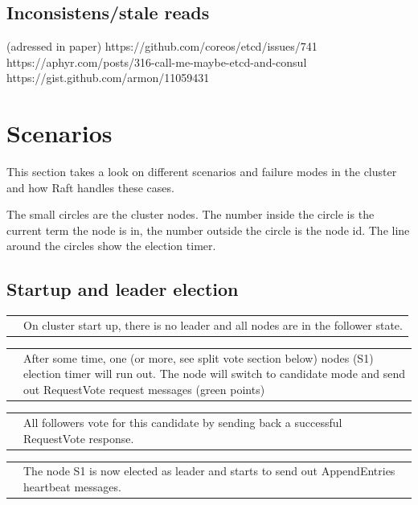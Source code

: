 \subsection{Inconsistens/stale reads}
(adressed in paper)
https://github.com/coreos/etcd/issues/741
https://aphyr.com/posts/316-call-me-maybe-etcd-and-consul
https://gist.github.com/armon/11059431

\section{Scenarios}
This section takes a look on different scenarios and failure modes in the cluster and how Raft handles these cases.

The small circles are the cluster nodes. The number inside the circle is the current term the node is in, the number outside the circle is the node id. The line around the circles show the election timer.

\newcommand{\raftscope}[2]{
  \begin{tabularx}{\textwidth}{  p{120px}  X  }
    \noindent\parbox[c]{\hsize}{
      \def\svgwidth{120}
      \fontsize{9pt}{11pt}\selectfont
      
    } & #2
\end{tabularx}
}

\newcommand{\raftscopedata}[2]{
  \begin{tabularx}{\textwidth}{  p{250px}  X  }
    \noindent\parbox[c]{\hsize}{
      \def\svgwidth{250}
      \fontsize{9pt}{11pt}\selectfont
      
    } & #2
\end{tabularx}
}

\subsection{Startup and leader election}


\raftscope{scenarios/election/40.pdf_tex}{
On cluster start up, there is no leader and all nodes are in the follower state.
}

\raftscope{scenarios/election/60.pdf_tex}{
After some time, one (or more, see split vote section below) nodes (S1) election timer will run out.
The node will switch to candidate mode and send out RequestVote request messages (green points)
}

\raftscope{scenarios/election/65.pdf_tex}{
All followers vote for this candidate by sending back a successful RequestVote response.
}

\raftscope{scenarios/election/72.pdf_tex}{
The node S1 is now elected as leader and starts to send out AppendEntries heartbeat messages.
}


